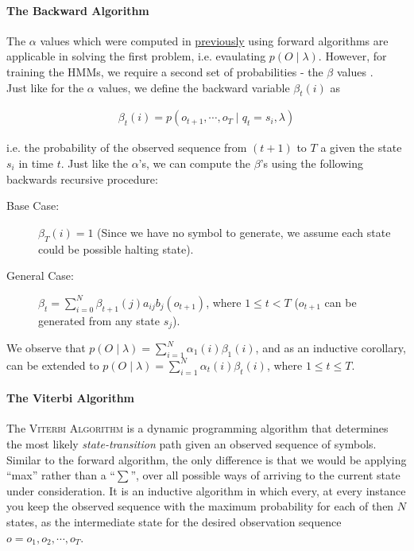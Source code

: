 \paragraph{The Backward Algorithm}

The $\alpha$ values which were computed in \hyperref[tfa]{previously} using forward algorithms are applicable in solving the first problem, i.e. evaulating $p(O \mid \lambda)$. However, for training the HMMs, we require a second set of probabilities - the $\beta$ values  \cite{dugad1996tutorial}.\\

Just like for the $\alpha$ values, we define the backward variable $\beta_{t}(i)$ as

\begin{gather*}
 \beta_t(i) = p(o_{t+1}, \cdots, o_{T} \mid q_t = s_i, \lambda)
\end{gather*}

i.e. the probability of the observed sequence from $(t+1)$ to $T$ a given the state $s_i$ in time $t$. Just like the $\alpha$'s, we can compute the $\beta$'s using the following backwards recursive procedure:

\begin{description}
	\item[Base Case:]{$\beta_{T}(i) = 1$ (Since we have no symbol to generate, we assume each state could be possible halting state). }
	\item[General Case:]{$\beta_{t} = \sum\limits_{i=0}^{N} \beta_{t+1}(j) a_{ij} b_{j}(o_{t+1})$, where $1 \leq t < T$ ($o_{t+1}$ can be generated from any state $s_j$).}
\end{description}

We observe that $p(O \mid  \lambda) = \sum\limits_{i=1}^{N} \alpha_{1}(i) \beta_{1}(i)$, and as an inductive corollary, can be extended to $p(O \mid  \lambda) = \sum\limits_{i=1}^{N} \alpha_{t}(i) \beta_{t}(i)$, where $1 \leq t \leq T$. \\


\paragraph{The Viterbi Algorithm}
\label{viterbi}


The \textsc{Viterbi Algorithm}  \cite{dugad1996tutorial} is a dynamic programming algorithm that determines the most likely \textit{state-transition} path given an observed sequence of symbols. Similar to the forward algorithm, the only difference is that we would be applying \enquote{max} rather than a \enquote{$\sum\limits$}, over all possible ways of arriving to the current state under consideration. It is an inductive algorithm in which every, at every instance you keep the observed sequence with the maximum probability for each of then $N$ states, as the intermediate state for the desired observation sequence $o = o_1, o_2, \cdots, o _{T}$.\\


